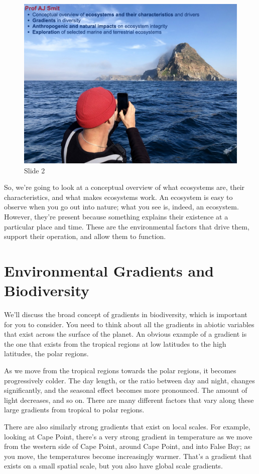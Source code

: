 \documentclass[
  12pt,
]{book}
\begin{document}
\begin{figure}[ht]
\centering
\includegraphics[width=0.8\linewidth]{../images/BDC334/BDC334-002.jpeg}
\caption*{Slide 2}
\end{figure}

So, we're going to look at a conceptual overview of what ecosystems are,
their characteristics, and what makes ecosystems work. An ecosystem is
easy to observe when you go out into nature; what you see is, indeed, an
ecosystem. However, they're present because something explains their
existence at a particular place and time. These are the environmental
factors that drive them, support their operation, and allow them to
function.

\section{Environmental Gradients and
Biodiversity}\label{environmental-gradients-and-biodiversity}

We'll discuss the broad concept of gradients in biodiversity, which is
important for you to consider. You need to think about all the gradients
in abiotic variables that exist across the surface of the planet. An
obvious example of a gradient is the one that exists from the tropical
regions at low latitudes to the high latitudes, the polar regions.

As we move from the tropical regions towards the polar regions, it
becomes progressively colder. The day length, or the ratio between day
and night, changes significantly, and the seasonal effect becomes more
pronounced. The amount of light decreases, and so on. There are many
different factors that vary along these large gradients from tropical to
polar regions.

There are also similarly strong gradients that exist on local scales.
For example, looking at Cape Point, there's a very strong gradient in
temperature as we move from the western side of Cape Point, around Cape
Point, and into False Bay; as you move, the temperatures become
increasingly warmer. That's a gradient that exists on a small spatial
scale, but you also have global scale gradients.
\end{document}
